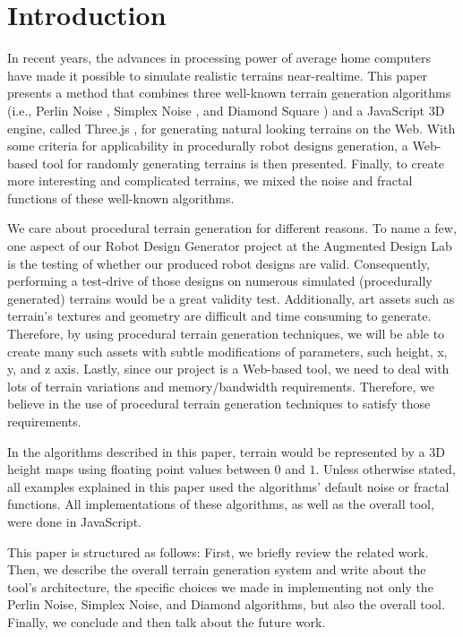 \section{Introduction} %
\label{sec:introduction}

In recent years, the advances in processing power of average home computers have made it possible to simulate realistic terrains near-realtime. This paper presents a method that combines three well-known terrain generation algorithms (i.e., Perlin Noise  \cite{perlin:2002}, Simplex Noise \cite{perlin:2001}, and Diamond Square \cite{fournier:1982}) and a JavaScript 3D engine, called Three.js \cite{threeJS}, for generating natural looking terrains on the Web. With some criteria for applicability in procedurally robot designs generation, a Web-based tool for randomly generating terrains is then presented. Finally, to create more interesting and complicated terrains, we mixed the noise and fractal functions of these well-known algorithms.     

We care about procedural terrain generation for different reasons. To name a few, one aspect of our Robot Design Generator project at the Augmented Design Lab is the testing of whether our produced robot designs are valid. Consequently, performing a test-drive of those designs on numerous simulated (procedurally generated) terrains would be a great validity test. Additionally, art assets such as terrain's textures and geometry are difficult and time consuming to generate. Therefore, by using procedural terrain generation techniques, we will be able to create many such assets with subtle modifications of parameters, such height, x, y, and z axis. Lastly, since our project is a Web-based tool, we need to deal with lots of terrain variations and memory/bandwidth requirements. Therefore, we believe in the use of procedural terrain generation techniques to satisfy those requirements.    

In the algorithms described in this paper, terrain would be represented by a 3D height maps using floating point values between $0$ and $1$. Unless otherwise stated, all examples explained in this paper used the algorithms' default noise or fractal functions. All implementations of these algorithms, as well as the overall tool, were done in JavaScript.  

This paper is structured as follows: First, we briefly review the related work. Then, we describe the overall terrain generation system and write about the tool's architecture, the specific choices we made in implementing not only the Perlin Noise, Simplex Noise, and Diamond algorithms, but also the overall tool. Finally, we conclude and then talk about the future work.  

